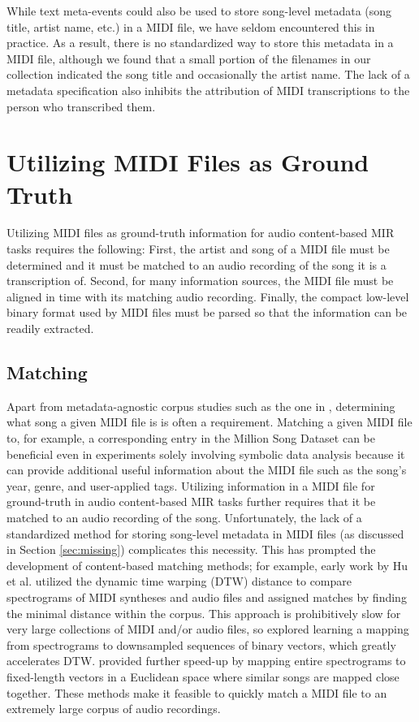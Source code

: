 \documentclass{article}
\begin{document}
While text meta-events could also be used to store song-level metadata (song title, artist name, etc.) in a MIDI file, we have seldom encountered this in practice.
As a result, there is no standardized way to store this metadata in a MIDI file, although we found that a small portion of the filenames in our collection indicated the song title and occasionally the artist name.
The lack of a metadata specification also inhibits the attribution of MIDI transcriptions to the person who transcribed them.

\section{Utilizing MIDI Files as Ground Truth}
\label{sec:utilizing}

Utilizing MIDI files as ground-truth information for audio content-based MIR tasks requires the following:
First, the artist and song of a MIDI file must be determined and it must be matched to an audio recording of the song it is a transcription of.
Second, for many information sources, the MIDI file must be aligned in time with its matching audio recording.
Finally, the compact low-level binary format used by MIDI files must be parsed so that the information can be readily extracted.

\subsection{Matching}

Apart from metadata-agnostic corpus studies such as the one in \cite{mauch2012corpus}, determining what song a given MIDI file is is often a requirement.
Matching a given MIDI file to, for example, a corresponding entry in the Million Song Dataset \cite{bertin2011million} can be beneficial even in experiments solely involving symbolic data analysis because it can provide additional useful information about the MIDI file such as the song's year, genre, and user-applied tags.
Utilizing information in a MIDI file for ground-truth in audio content-based MIR tasks further requires that it be matched to an audio recording of the song.
Unfortunately, the lack of a standardized method for storing song-level metadata in MIDI files (as discussed in Section \ref{sec:missing}) complicates this necessity.
This has prompted the development of content-based matching methods; for example, early work by Hu et al.\cite{hu2003polyphonic} utilized the dynamic time warping (DTW) distance to compare spectrograms of MIDI syntheses and audio files and assigned matches by finding the minimal distance within the corpus.
This approach is prohibitively slow for very large collections of MIDI and/or audio files, so \cite{raffel2015large} explored learning a mapping from spectrograms to downsampled sequences of binary vectors, which greatly accelerates DTW.
\cite{raffel2016pruning} provided further speed-up by mapping entire spectrograms to fixed-length vectors in a Euclidean space where similar songs are mapped close together.
These methods make it feasible to quickly match a MIDI file to an extremely large corpus of audio recordings.
\end{document}
